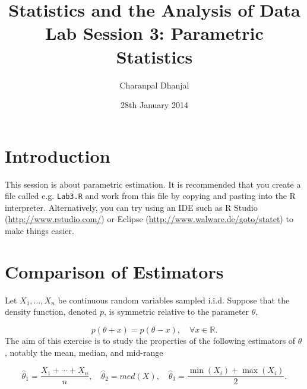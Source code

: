 \documentclass[a4paper,10pt]{article}
\title{Statistics and the Analysis of Data\\ Lab Session 3: Parametric Statistics}
\author{Charanpal Dhanjal}
\begin{document}
\date{28th January 2014}
\maketitle

\section{Introduction} 

This session is about parametric estimation. It is recommended that you create a file called e.g. \texttt{Lab3.R} and work from this file by copying and pasting into the R interpreter. Alternatively, you can try using an IDE such as R Studio (\url{http://www.rstudio.com/}) or Eclipse (\url{http://www.walware.de/goto/statet}) to make things easier. 

\section{Comparison of Estimators} 

Let $X_1, \ldots, X_n$ be continuous random variables sampled i.i.d. Suppose that the density function, denoted $p$, is symmetric relative to the parameter $\theta$, 

\begin{displaymath} 
p(\theta + x) = p(\theta - x), \quad \forall x \in \mathbb{R}. 
\end{displaymath}
The aim of this exercise is to study the properties of the following estimators of $\theta$, notably the mean, median, and mid-range 

\begin{displaymath}
\hat{\theta}_1 = \frac{X_1 + \cdots + X_n}{n}, \quad \hat{\theta}_2 = med(X), \quad \hat{\theta}_3 = \frac{\min(X_i) + \max(X_i)}{2}.
\end{displaymath}
\end{document}
